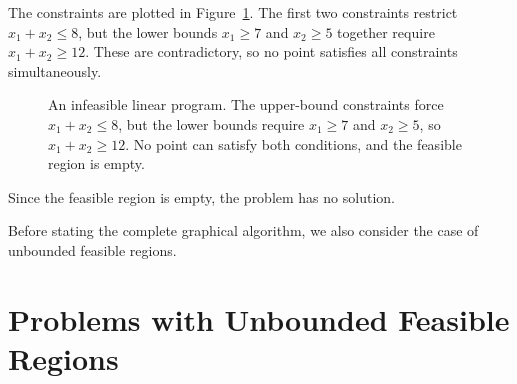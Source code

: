 \begin{solution}
The constraints are plotted in Figure~\ref{fig:LPInfeasible}. The first two constraints restrict $x_1+x_2\leq 8$, but the lower bounds $x_1\geq 7$ and $x_2\geq 5$ together require $x_1+x_2\geq 12$. These are contradictory, so no point satisfies all constraints simultaneously.

\begin{figure}[H]
\centering
{}
\caption{An infeasible linear program. The upper-bound constraints force $x_1+x_2\leq 8$, but the lower bounds require $x_1\geq 7$ and $x_2\geq 5$, so $x_1+x_2\geq 12$. No point can satisfy both conditions, and the feasible region is empty.}
\label{fig:LPInfeasible}
\end{figure}

Since the feasible region is empty, the problem has no solution.
\label{ex:LPNoSoln}
\end{solution}
Before stating the complete graphical algorithm, we also consider the case of unbounded feasible regions.

\section{Problems with Unbounded Feasible Regions}\label{sec:unbounded-regions}

